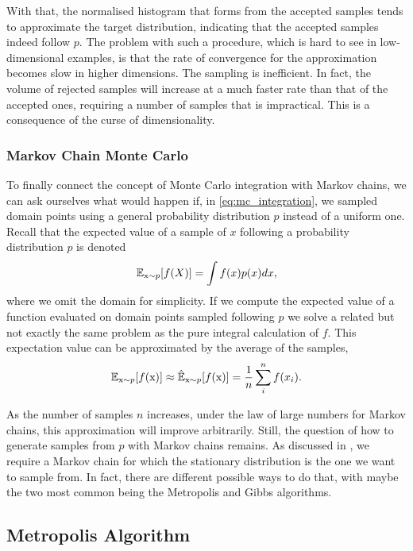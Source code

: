 With that, the normalised histogram that forms from the accepted samples tends to approximate the target distribution, indicating that the accepted samples indeed follow $p$. The problem with such a procedure, which is hard to see in low-dimensional examples, is that the rate of convergence for the approximation becomes slow in higher dimensions. The sampling is inefficient. In fact, the volume of rejected samples will increase at a much faster rate than that of the accepted ones, requiring a number of samples that is impractical. This is a consequence of the curse of dimensionality. 


\subsubsection{Markov Chain Monte Carlo}
To finally connect the concept of Monte Carlo integration with Markov chains, we can ask ourselves what would happen if, in \eqref{eq:mc_integration},  we sampled domain points using a general probability distribution $p$ instead of a uniform one. Recall that the expected value of a sample of $x$ following a probability distribution $p$ is denoted
\begin{align*}
    \mathbb{E}_{{\textnormal{x}}\sim p}[f(X)] = \int f(x)p(x) dx,
\end{align*}
where we omit the domain for simplicity. If we compute the expected value of a function evaluated on domain points sampled following $p$ we solve a related but not exactly the same problem as the pure integral calculation of $f$. This expectation value can be approximated by the average of the samples,
\begin{align*}
    \mathbb{E}_{{\textnormal{x}}\sim p}[f({\textnormal{x}})] \approx \hat{\mathbb{E}}_{{\textnormal{x}}\sim p}[f({\textnormal{x}})] = \frac{1}{n}\sum_{i}^{n}f(x_i).
\end{align*}

As the number of samples $n$ increases, under the law of large numbers for Markov chains, this approximation will improve arbitrarily. Still, the question of how to generate samples from $p$ with Markov chains remains. As discussed in , we require a Markov chain for which the stationary distribution is the one we want to sample from. In fact, there are different possible ways to do that, with maybe the two most common being the Metropolis and Gibbs algorithms. 

\subsection{Metropolis Algorithm }\label{sec:metropolis}

